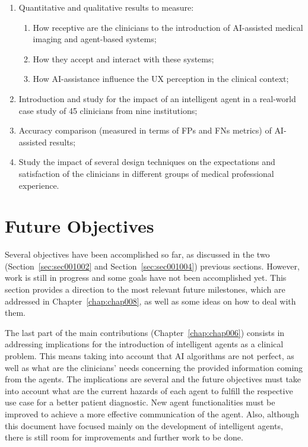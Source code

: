 \begin{enumerate}
\begin{enumerate}[label*=\arabic*.]
\item Quantitative and qualitative results to measure:
\begin{enumerate}[label*=\arabic*.]
\item How receptive are the clinicians to the introduction of \ac{AI}-assisted medical imaging and agent-based systems;
\item How they accept and interact with these systems;
\item How \ac{AI}-assistance influence the \ac{UX} perception in the clinical context;
\end{enumerate}
\item Introduction and study for the impact of an intelligent agent in a real-world case study of 45 clinicians from nine institutions;
\item Accuracy comparison (measured in terms of \acp{FP} and \acp{FN} metrics) of \ac{AI}-assisted results;
\item Study the impact of several design techniques on the expectations and satisfaction of the clinicians in different groups of medical professional experience.
\end{enumerate}
\end{enumerate}

\clearpage

\section{Future Objectives}
\label{sec:sec001005}

Several objectives have been accomplished so far, as discussed in the two (Section~\ref{sec:sec001002} and Section~\ref{sec:sec001004}) previous sections.
However, work is still in progress and some goals have not been accomplished yet.
This section provides a direction to the most relevant future milestones, which are addressed in Chapter~\ref{chap:chap008}, as well as some ideas on how to deal with them.

The last part of the main contributions (Chapter~\ref{chap:chap006}) consists in addressing implications for the introduction of intelligent agents as a clinical problem.
This means taking into account that \ac{AI} algorithms are not perfect, as well as what are the clinicians' needs concerning the provided information coming from the agents.
The implications are several and the future objectives must take into account what are the current hazards of each agent to fulfill the respective use case for a better patient diagnostic.
New agent functionalities must be improved to achieve a more effective communication of the agent.
Also, although this document have focused mainly on the development of intelligent agents, there is still room for improvements and further work to be done.

